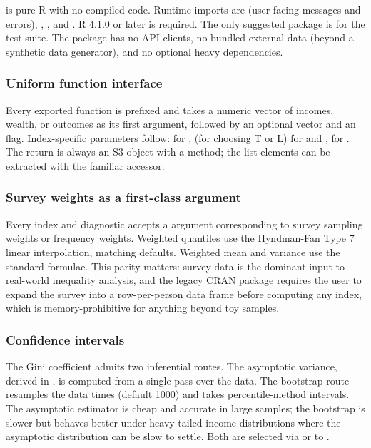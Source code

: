  is pure R with no compiled code. Runtime imports
are  (user-facing messages and errors), ,
, and . R 4.1.0 or later is required. The
only suggested package is  for the test suite. The
package has no API clients, no bundled external data (beyond a synthetic
data generator), and no optional heavy dependencies.

\subsubsection{Uniform function
interface}\label{uniform-function-interface}

Every exported function is prefixed  and takes a numeric
vector of incomes, wealth, or outcomes as its first argument, followed
by an optional  vector and an  flag.
Index-specific parameters follow:  for
,  (for choosing T or L) for
 and ,  for
. The return is always an S3 object with a
 method; the list elements can be extracted with the
familiar \code{\$} accessor.

\subsubsection{Survey weights as a first-class
argument}\label{survey-weights-as-a-first-class-argument}

Every index and diagnostic accepts a  argument
corresponding to survey sampling weights or frequency weights. Weighted
quantiles use the Hyndman-Fan Type 7 linear interpolation, matching
 defaults. Weighted mean and variance use the
standard formulae. This parity matters: survey data is the dominant
input to real-world inequality analysis, and the legacy CRAN package
 requires the user to expand the survey into a
row-per-person data frame before computing any index, which is
memory-prohibitive for anything beyond toy samples.

\subsubsection{Confidence intervals}\label{confidence-intervals}

The Gini coefficient admits two inferential routes. The asymptotic
variance, derived in \citet{davidson2009reliable}, is computed from a
single pass over the data. The bootstrap route resamples the data
 times (default 1000) and takes percentile-method intervals. The
asymptotic estimator is cheap and accurate in large samples; the
bootstrap is slower but behaves better under heavy-tailed income
distributions where the asymptotic distribution can be slow to settle.
Both are selected via  or
 to .

